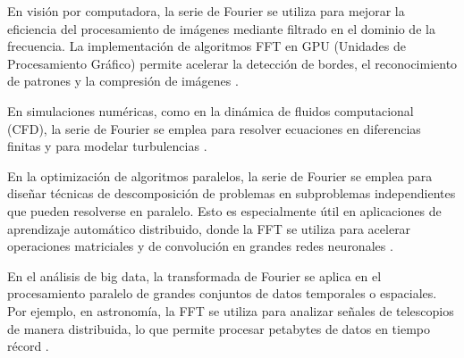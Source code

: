 {En visión por computadora, la serie de Fourier se utiliza para mejorar la eficiencia del procesamiento de imágenes mediante filtrado en el dominio de la frecuencia. La implementación de algoritmos FFT en GPU (Unidades de Procesamiento Gráfico) permite acelerar la detección de bordes, el reconocimiento de patrones y la compresión de imágenes \cite{moreland2003fft}.
\vspace{10pt}

En simulaciones numéricas, como en la dinámica de fluidos computacional (CFD), la serie de Fourier se emplea para resolver ecuaciones en diferencias finitas y para modelar turbulencias \cite{canuto2006spectral}.

\vspace{10pt}

En la optimización de algoritmos paralelos, la serie de Fourier se emplea para diseñar técnicas de descomposición de problemas en subproblemas independientes que pueden resolverse en paralelo. Esto es especialmente útil en aplicaciones de aprendizaje automático distribuido, donde la FFT se utiliza para acelerar operaciones matriciales y de convolución en grandes redes neuronales \cite{goodfellow2016deep}.
\vspace{10pt}

En el análisis de big data, la transformada de Fourier se aplica en el procesamiento paralelo de grandes conjuntos de datos temporales o espaciales. Por ejemplo, en astronomía, la FFT se utiliza para analizar señales de telescopios de manera distribuida, lo que permite procesar petabytes de datos en tiempo récord \cite{bracewell2003fourier}.



}

